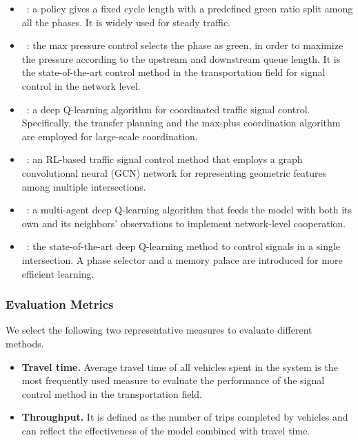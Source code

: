 \begin{itemize}
\item \FT~\cite{koonce2008traffic}: a policy gives a fixed cycle length with a predefined green ratio split among all the phases. It is widely used for steady traffic.
\item \Maxpressure~\cite{varaiya2013max}: the max pressure control selects the phase as green, in order to maximize the pressure according to the upstream and downstream queue length. It is the state-of-the-art control method in the transportation field for signal control in the network level.
\item \NIPS~\cite{van2016coordinated}: a deep Q-learning algorithm for coordinated traffic signal control. Specifically, the transfer planning and the max-plus coordination algorithm are employed for large-scale coordination.
\item \GCN~\cite{nishi2018traffic}: an RL-based traffic signal control method that employs a graph convolutional neural (GCN) network for representing geometric features among multiple intersections. 
\item \NeighborRL~\cite{arel2010reinforcement}: a multi-agent deep Q-learning algorithm that feeds the model with both its own and its neighbors' observations to implement network-level cooperation.
\item \Deeplight~\cite{wei2018intellilight}: the state-of-the-art deep Q-learning method to control signals in a single intersection. A phase selector and a memory palace are introduced for more efficient learning. 
\end{itemize}

\subsubsection[wide,noitemsep,topsep=0pt]{Evaluation Metrics}
We select the following two representative measures to evaluate different methods.
\begin{itemize}
\item \textbf{Travel time.} Average travel time of all vehicles spent in the system is the most frequently used measure to evaluate the performance of the signal control method in the transportation field.
\item \textbf{Throughput.} It is defined as the number of trips completed by vehicles and can reflect the effectiveness of the model combined with travel time.
\end{itemize}



